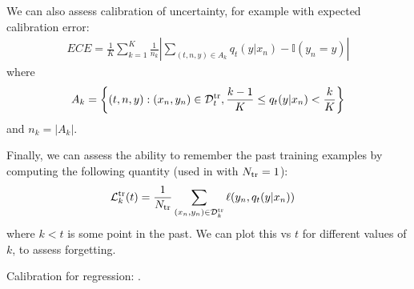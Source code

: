We can also assess calibration of uncertainty, for example with expected calibration error:
\begin{align}
    ECE = \frac{1}{K} \sum_{k=1}^K \frac{1}{n_k}\left\vert\sum_{(t,n,y)\in A_k} q_t(y\vert x_n) - \mathbb{I}(y_n=y)\right\vert
\end{align}
where 
\begin{align}
    A_k = \left\{(t,n,y):(x_n,y_n)\in\mathcal{D}^{\rm    tr}_t,\frac{k-1}{K}\le q_t(y\vert x_n)<\frac{k}{K}\right\}
\end{align}
and $n_k=|A_k|$.

Finally, we can assess the ability to remember the past training examples by computing the following quantity (used in \citep{ORFit} with $N_{\mathrm{tr}}=1$):
\begin{align}
\mathcal{L}_{k}^{\mathrm{tr}}(t)
 &=  \frac{1}{N_{\mathrm{tr}}}
\sum_{(x_n, y_n) \in {\mathcal{D}}_{k}^{\mathrm{tr}}} \ell(y_n, q_t(y\vert x_n))
\end{align}
where $k < t$ is some point in the past.
We can plot this vs $t$ for different values of $k$, to assess forgetting.

Calibration for regression:
\cite{Kuleshov2018}.
